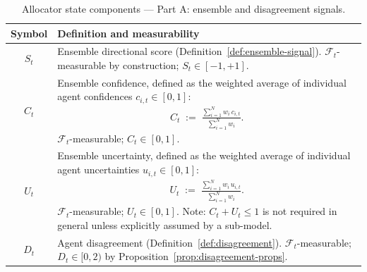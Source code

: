 \documentclass[12pt,openany]{book}
\numberwithin{equation}{chapter}
\theoremstyle{plain}
\theoremstyle{definition}
\theoremstyle{remark}
\numberwithin{equation}{chapter}
\theoremstyle{plain}
\begin{document}
\begin{table}[H]
\centering
\caption{Allocator state components --- Part A: ensemble
         and disagreement signals.}
\label{tab:allocator-state-A}
\small
\begin{tabularx}{\linewidth}{@{} c X @{}}
\toprule
\textbf{Symbol} & \textbf{Definition and measurability} \\
\midrule
$S_t$ &
  Ensemble directional score
  (Definition~\ref{def:ensemble-signal}).
  $\mathcal{F}_t$-measurable by construction;
  $S_t \in [-1,+1]$. \\[4pt]
$C_t$ &
  Ensemble confidence, defined as the weighted average
  of individual agent confidences $c_{i,t} \in [0,1]$:
  \begin{align*}
    C_t \;:=\;
    \frac{\displaystyle\sum_{i=1}^{N} w_i\,c_{i,t}}
         {\displaystyle\sum_{i=1}^{N} w_i}.
  \end{align*}
  $\mathcal{F}_t$-measurable; $C_t \in [0,1]$. \\[4pt]
$U_t$ &
  Ensemble uncertainty, defined as the weighted average
  of individual agent uncertainties $u_{i,t} \in [0,1]$:
  \begin{align*}
    U_t \;:=\;
    \frac{\displaystyle\sum_{i=1}^{N} w_i\,u_{i,t}}
         {\displaystyle\sum_{i=1}^{N} w_i}.
  \end{align*}
  $\mathcal{F}_t$-measurable; $U_t \in [0,1]$.
  Note: $C_t + U_t \leq 1$ is not required in general
  unless explicitly assumed by a sub-model. \\[4pt]
$D_t$ &
  Agent disagreement
  (Definition~\ref{def:disagreement}).
  $\mathcal{F}_t$-measurable;
  $D_t \in [0,2)$ by
  Proposition~\ref{prop:disagreement-props}. \\
\bottomrule
\end{tabularx}
\end{table}
\end{document}
